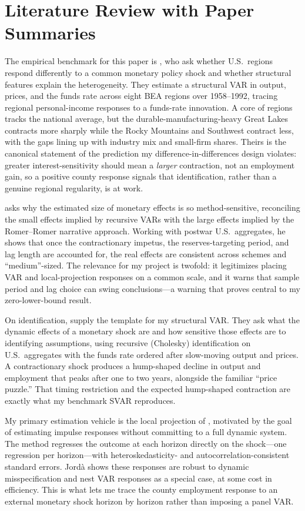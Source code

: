 \documentclass[11pt]{article}
\begin{document}
\section{Literature Review with Paper Summaries}

The empirical benchmark for this paper is \citet{carlino1998}, who ask whether U.S.\ regions
respond differently to a common monetary policy shock and whether structural features explain the
heterogeneity. They estimate a structural VAR in output, prices, and the funds rate across eight
BEA regions over 1958--1992, tracing regional personal-income responses to a funds-rate innovation.
A core of regions tracks the national average, but the durable-manufacturing-heavy Great Lakes
contracts more sharply while the Rocky Mountains and Southwest contract less, with the gaps lining
up with industry mix and small-firm shares. Theirs is the canonical statement of the prediction my
difference-in-differences design violates: greater interest-sensitivity should mean a \emph{larger}
contraction, not an employment gain, so a positive county response signals that identification,
rather than a genuine regional regularity, is at work.

\citet{coibion2012} asks why the estimated size of monetary effects is so method-sensitive,
reconciling the small effects implied by recursive VARs with the large effects implied by the
Romer--Romer narrative approach. Working with postwar U.S.\ aggregates, he shows that once the
contractionary impetus, the reserves-targeting period, and lag length are accounted for, the real
effects are consistent across schemes and ``medium''-sized. The relevance for my project is
twofold: it legitimizes placing VAR and local-projection responses on a common scale, and it warns
that sample period and lag choice can swing conclusions---a warning that proves central to my
zero-lower-bound result.

On identification, \citet{cee1999} supply the template for my structural VAR. They ask what the
dynamic effects of a monetary shock are and how sensitive those effects are to identifying
assumptions, using recursive (Cholesky) identification on U.S.\ aggregates with the funds rate
ordered after slow-moving output and prices. A contractionary shock produces a hump-shaped decline
in output and employment that peaks after one to two years, alongside the familiar ``price
puzzle.'' That timing restriction and the expected hump-shaped contraction are exactly what my
benchmark SVAR reproduces.

My primary estimation vehicle is the local projection of \citet{jorda2005}, motivated by the goal
of estimating impulse responses without committing to a full dynamic system. The method regresses
the outcome at each horizon directly on the shock---one regression per horizon---with
heteroskedasticity- and autocorrelation-consistent standard errors. Jord\`a shows these responses
are robust to dynamic misspecification and nest VAR responses as a special case, at some cost in
efficiency. This is what lets me trace the county employment response to an external monetary shock
horizon by horizon rather than imposing a panel VAR.
\end{document}
